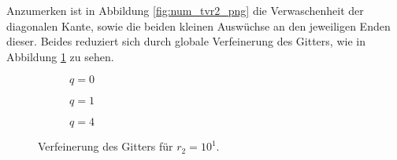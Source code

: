 \documentclass{mythesis}
\begin{document}



Anzumerken ist in Abbildung \ref{fig:num_tvr2_png} die Verwaschenheit der diagonalen Kante, sowie die beiden kleinen Auswüchse an den jeweiligen Enden dieser.
Beides reduziert sich durch globale Verfeinerung des Gitters, wie in Abbildung \ref{fig:num_tvrefine_png} zu sehen.

\begin{figure}[ht]
    \centering
    \begin{subfigure}{0.2\textwidth}
	\centering
	\caption{$q=0$}
    \end{subfigure}%
    \begin{subfigure}{0.2\textwidth}
	\centering
	\caption{$q=1$}
    \end{subfigure}%
    \begin{subfigure}{0.2\textwidth}
	\centering
	\caption{$q=4$}
    \end{subfigure}%
    \caption{Verfeinerung des Gitters für $r_2=10^1$.}
    \label{fig:num_tvrefine_png}
\end{figure}

\end{document}
